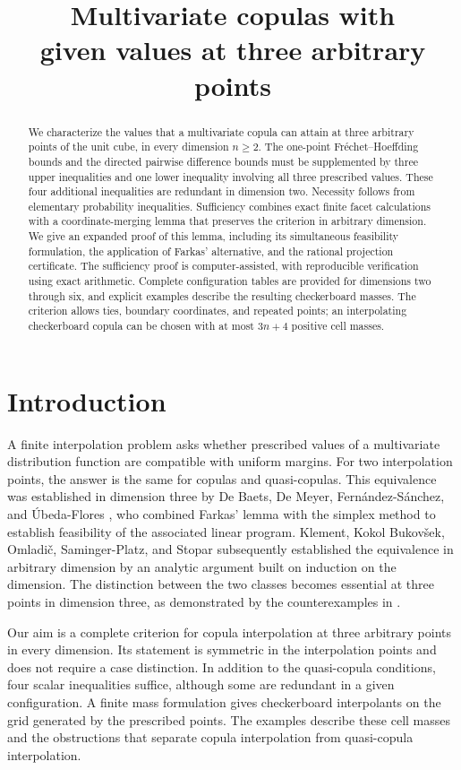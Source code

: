 \documentclass[a4paper,11pt]{amsart}
\title[Multivariate copulas with given values at three points]
{Multivariate copulas with\\given values at three arbitrary points}
\date{}
\numberwithin{equation}{section}
\theoremstyle{definition}
\theoremstyle{remark}
\begin{document}
\begin{abstract}
We characterize the values that a multivariate copula can attain at three
arbitrary points of the unit cube, in every dimension $n\geq2$.
The one-point Fr\'echet--Hoeffding bounds and the directed pairwise
difference bounds must be supplemented by three upper inequalities and
one lower inequality involving all three prescribed values. These four
additional inequalities are redundant in dimension two.
Necessity follows from elementary probability inequalities. Sufficiency
combines exact finite facet calculations with a coordinate-merging lemma
that preserves the criterion in arbitrary dimension. We give an expanded
proof of this lemma, including its simultaneous feasibility formulation,
the application of Farkas' alternative, and the rational projection
certificate. The sufficiency proof is computer-assisted, with reproducible
verification using exact arithmetic. Complete configuration tables are
provided for dimensions two through six, and explicit examples describe
the resulting checkerboard masses. The criterion allows ties,
boundary coordinates, and repeated points; an interpolating checkerboard
copula can be chosen with at most $3n+4$ positive cell masses.
\end{abstract}
\maketitle

\section{Introduction}\label{sec:intro}
A finite interpolation problem asks whether prescribed values of a
multivariate distribution function are compatible with uniform margins.
For two interpolation points, the answer is the same for copulas and
quasi-copulas. This equivalence was established in dimension three by
De Baets, De Meyer, Fern\'andez-S\'anchez, and \'Ubeda-Flores
\cite{DeBaets2013}, who combined Farkas' lemma with the simplex method
to establish feasibility of the associated linear program.
Klement, Kokol Bukov\v{s}ek, Omladi\v{c}, Saminger-Platz, and Stopar
\cite{Klement2023} subsequently established the equivalence in arbitrary
dimension by an analytic argument built on induction on
the dimension. The distinction between the two classes becomes
essential at three points in dimension three, as demonstrated by the
counterexamples in \cite{DeBaets2013}.

Our aim is a complete criterion for copula interpolation at three arbitrary
points in every dimension. Its statement is symmetric in the interpolation
points and does not require a case distinction. In addition to the
quasi-copula conditions, four scalar inequalities suffice, although some
are redundant in a given configuration. A finite mass formulation gives
checkerboard interpolants on the grid generated by the prescribed points.
The examples describe these cell masses and the obstructions that separate
copula interpolation from quasi-copula interpolation.
\end{document}
